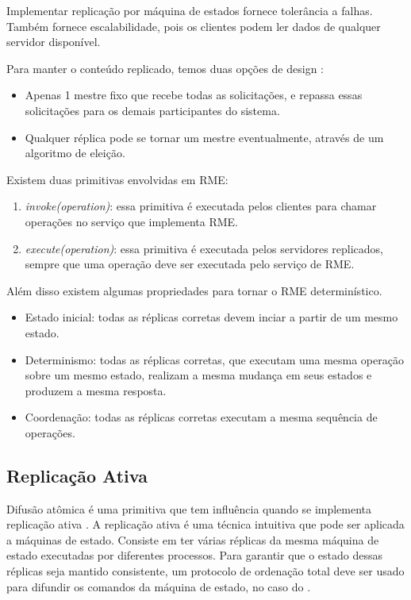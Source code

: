 Implementar replicação por máquina de estados fornece tolerância a falhas. Também fornece escalabilidade, pois os clientes podem ler dados de qualquer servidor disponível.

Para manter o conteúdo replicado, temos duas opções de design \cite{wtf2018}:

\begin{itemize}
\item Apenas 1 mestre fixo que recebe todas as solicitações, e repassa essas solicitações para os demais participantes do sistema.
\item Qualquer réplica pode se tornar um mestre eventualmente, através de um algoritmo de eleição.
\end{itemize}

Existem duas primitivas envolvidas em RME:

\begin{enumerate}
\item \textit{invoke(operation)}: essa primitiva é executada pelos clientes para chamar operações no serviço que implementa RME.
\item \textit{execute(operation)}: essa primitiva é executada pelos servidores replicados, sempre que uma operação deve ser executada pelo serviço de RME.
\end{enumerate}

Além disso existem algumas propriedades para tornar o RME determinístico.

\begin{itemize}
\item Estado inicial: todas as réplicas corretas devem inciar a partir de um mesmo estado.
\item Determinismo: todas as réplicas corretas, que executam uma mesma operação sobre um mesmo estado, realizam a mesma mudança em seus estados e produzem a mesma resposta.
\item Coordenação: todas as réplicas corretas executam a mesma sequência de operações.
\end{itemize}

\subsection{Replicação Ativa}

Difusão atômica é uma primitiva que tem influência quando se implementa replicação ativa \cite{lamport1978implementation, schneider1990}. A replicação ativa é uma técnica intuitiva que pode ser aplicada a máquinas de estado. Consiste em ter várias réplicas da mesma máquina de estado executadas por diferentes processos. Para garantir que o estado dessas réplicas seja mantido consistente, um protocolo de ordenação total deve ser usado para difundir os comandos da máquina de estado, no caso do \cite{PauloVerissimoLuisRodrigues}.

